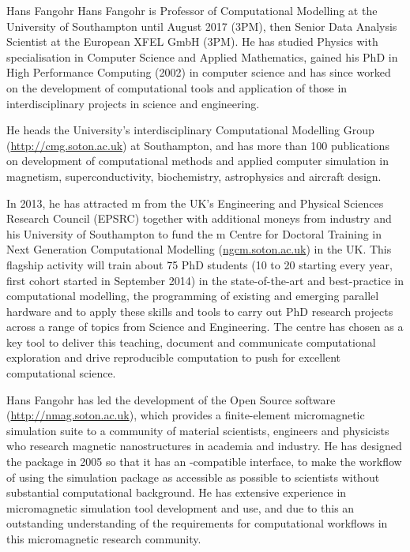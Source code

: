 \begin{participant}[PM=3,type=leadPI,gender=male]{Hans Fangohr}
  Hans Fangohr is Professor of Computational Modelling at the
  University of Southampton until August 2017 (3PM), then Senior Data
  Analysis Scientist at the European XFEL GmbH (3PM). He has studied Physics with
  specialisation in Computer Science and Applied Mathematics, gained
  his PhD in High Performance Computing (2002) in computer science and
  has since worked on the development of computational tools and
  application of those in interdisciplinary projects in science and engineering.

  He heads the University's interdisciplinary Computational Modelling
  Group (\url{http://cmg.soton.ac.uk}) at Southampton, and has more than 100
  publications on development of computational methods and applied
  computer simulation in magnetism, superconductivity, biochemistry,
  astrophysics and aircraft design.

  In 2013, he has attracted m from the UK's Engineering and
  Physical Sciences Research Council (EPSRC) together with additional
  moneys from industry and his University of Southampton to fund the
  m Centre for Doctoral Training in Next Generation
  Computational Modelling
  (\href{http://ngcm.soton.ac.uk}{ngcm.soton.ac.uk}) in the UK. This
  flagship activity will train about 75 PhD students (10 to 20
  starting every year, first cohort started in September 2014) in the
  state-of-the-art and best-practice in computational modelling, the
  programming of existing and emerging parallel hardware and to apply
  these skills and tools to carry out PhD research projects across a range of
  topics from Science and Engineering. The centre has chosen \IPython
  as a key tool to deliver this teaching, document and communicate
  computational exploration and drive reproducible computation to push
  for excellent computational science.

  Hans Fangohr has led the development of the Open Source 
  software (\url{http://nmag.soton.ac.uk}), which provides a finite-element
  micromagnetic simulation suite to a community of material
  scientists, engineers and physicists who research magnetic
  nanostructures in academia and industry. He has designed the package
  in 2005 so that it has an \IPython-compatible \Python interface, to
  make the workflow of using the simulation package as accessible as
  possible to scientists without substantial computational
  background. He has extensive experience in micromagnetic simulation
  tool development and use, and due to this an outstanding understanding of the
  requirements for computational workflows in this micromagnetic
  research community.


\end{participant}
